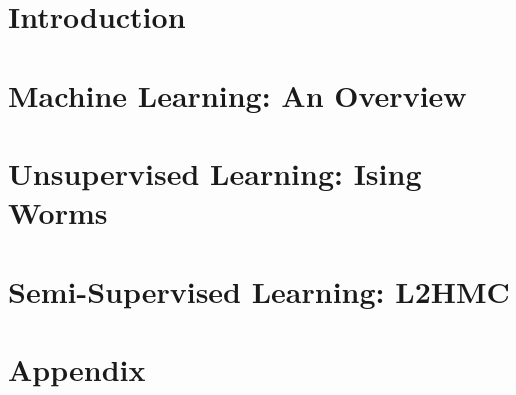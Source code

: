\documentclass[12pt,notitlepage]{report}
\begin{document}
\begin{doublespace}

\chapter{Introduction}%
\label{chap:introduction}


\chapter{Machine Learning: An Overview}%
\label{chap:machine_learning}


\chapter{Unsupervised Learning: Ising Worms}%
\label{chap:unsupervised_learning}

%
\chapter{Semi-Supervised Learning: L2HMC}%
\label{chap:semi_supervised_learning}


% 
% 
% 

% 
% 
% 

% 
\appendix%
\chapter{Appendix}


\clearpage
\printbibliography[title={References}, heading=bibintoc]

\end{doublespace}
\end{document}
